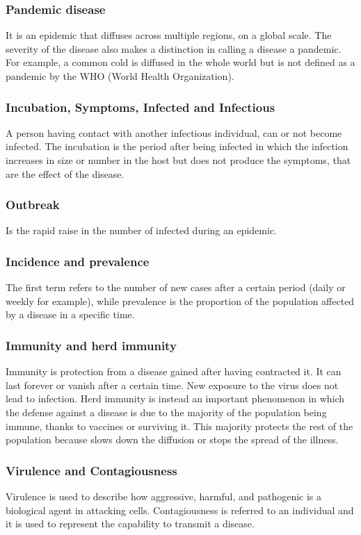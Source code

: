 \subsubsection{Pandemic disease} It is an epidemic that diffuses across multiple regions, on a global scale. The severity of the disease also makes a distinction in calling a disease a pandemic. For example, a common cold is diffused in the whole world but is not defined as a pandemic by the WHO (World Health Organization). 

\subsubsection{Incubation, Symptoms, Infected and Infectious}   A person having contact with another infectious individual, can or not become infected. The incubation is the period after being infected in which the infection increases in size or number in the host but does not produce the symptoms, that are the effect of the disease. 

\subsubsection{Outbreak} Is the rapid raise in the number of infected during an epidemic.

\subsubsection{Incidence and prevalence} The first term refers to the number of new cases after a certain period (daily or weekly for example), while prevalence is the proportion of the population affected by a disease in a specific time.

\subsubsection{Immunity and herd immunity} Immunity is protection from a disease gained after having contracted it. It can last forever or vanish after a certain time. New exposure to the virus does not lead to infection. Herd immunity is instead an important phenomenon in which the defense against a disease is due to the majority of the population being immune, thanks to vaccines or surviving it. This majority protects the rest of the population because slows down the diffusion or stops the spread of the illness.

\subsubsection{Virulence and Contagiousness}  Virulence is used to describe how aggressive, harmful, and pathogenic is a biological agent in attacking cells. Contagiousness is referred to an individual and it is used to represent the capability to transmit a disease. 

